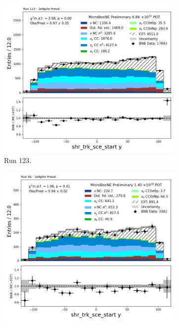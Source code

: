 \begin{figure}[H]
    \centering
    \begin{subfigure}[t]{0.32\linewidth}
        \includegraphics[width=\linewidth]{technote/Appendix_Preselection/Figures/1eNp0pi/Run123/shr_trk_sce_start_y_Run123_1eNp0pi_Presel.png}
        \caption{Run 123.}
    \end{subfigure}%
    \hspace{0.2cm}%
    \begin{subfigure}[t]{0.32\linewidth}
        \includegraphics[width=\linewidth]{technote/Appendix_Preselection/Figures/1eNp0pi/Run4b/shr_trk_sce_start_y_Run4b_1eNp0pi_Presel.png}

\end{subfigure}
\end{figure}
